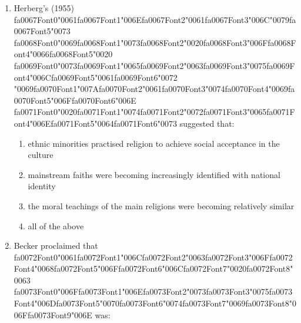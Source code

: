 \documentclass[12pt]{article}
\begin{document}
\begin{enumerate}[label=\arabic*.]
\item Herberg's (1955) {\csname fa0067Font0\endcsname\char"0061}{\csname fa0067Font1\endcsname\char"006E}{\csname fa0067Font2\endcsname\char"0061}{\csname fa0067Font3\endcsname\char"006C}{\char"0079}{\csname fa0067Font5\endcsname\char"0073} {\csname fa0068Font0\endcsname\char"0069}{\csname fa0068Font1\endcsname\char"0073}{\csname fa0068Font2\endcsname\char"0020}{\csname fa0068Font3\endcsname\char"006F}{\csname fa0068Font4\endcsname\char"0066}{\csname fa0068Font5\endcsname\char"0020} {\csname fa0069Font0\endcsname\char"0073}{\csname fa0069Font1\endcsname\char"0065}{\csname fa0069Font2\endcsname\char"0063}{\csname fa0069Font3\endcsname\char"0075}{\csname fa0069Font4\endcsname\char"006C}{\csname fa0069Font5\endcsname\char"0061}{\csname fa0069Font6\endcsname\char"0072} {\char"0069}{\csname fa0070Font1\endcsname\char"007A}{\csname fa0070Font2\endcsname\char"0061}{\csname fa0070Font3\endcsname\char"0074}{\csname fa0070Font4\endcsname\char"0069}{\csname fa0070Font5\endcsname\char"006F}{\csname fa0070Font6\endcsname\char"006E} {\csname fa0071Font0\endcsname\char"0020}{\csname fa0071Font1\endcsname\char"0074}{\csname fa0071Font2\endcsname\char"0072}{\csname fa0071Font3\endcsname\char"0065}{\csname fa0071Font4\endcsname\char"006E}{\csname fa0071Font5\endcsname\char"0064}{\csname fa0071Font6\endcsname\char"0073} suggested that:
\begin{enumerate}[label=(\alph*)]
    \item ethnic minorities practised religion to achieve social acceptance in the culture
    \item mainstream faiths were becoming increasingly identified with national identity
    \item the moral teachings of the main religions were becoming relatively similar
    \item all of the above
\end{enumerate}
\item Becker proclaimed that {\csname fa0072Font0\endcsname\char"0061}{\csname fa0072Font1\endcsname\char"006C}{\csname fa0072Font2\endcsname\char"0063}{\csname fa0072Font3\endcsname\char"006F}{\csname fa0072Font4\endcsname\char"0068}{\csname fa0072Font5\endcsname\char"006F}{\csname fa0072Font6\endcsname\char"006C}{\csname fa0072Font7\endcsname\char"0020}{\csname fa0072Font8\endcsname\char"0063} {\csname fa0073Font0\endcsname\char"006F}{\csname fa0073Font1\endcsname\char"006E}{\csname fa0073Font2\endcsname\char"0073}{\csname fa0073Font3\endcsname\char"0075}{\csname fa0073Font4\endcsname\char"006D}{\csname fa0073Font5\endcsname\char"0070}{\csname fa0073Font6\endcsname\char"0074}{\csname fa0073Font7\endcsname\char"0069}{\csname fa0073Font8\endcsname\char"006F}{\csname fa0073Font9\endcsname\char"006E} was:

\end{enumerate}
\end{document}
